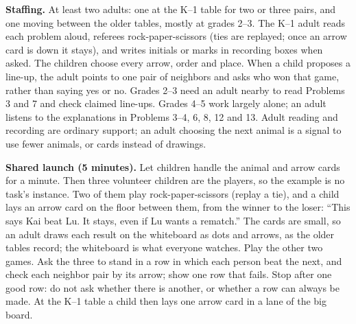 \documentclass[11pt]{article}
\newcommand{\bt}{\,$\to$\,\allowbreak}
\begin{document}
\textbf{Staffing.} At least two adults: one at the K--1 table for two or three pairs, and one moving between the older tables, mostly at grades 2--3. The K--1 adult reads each problem aloud, referees rock-paper-scissors (ties are replayed; once an arrow card is down it stays), and writes initials or marks in recording boxes when asked. The children choose every arrow, order and place. When a child proposes a line-up, the adult points to one pair of neighbors and asks who won that game, rather than saying yes or no. Grades 2--3 need an adult nearby to read Problems 3 and 7 and check claimed line-ups. Grades 4--5 work largely alone; an adult listens to the explanations in Problems 3--4, 6, 8, 12 and 13. Adult reading and recording are ordinary support; an adult choosing the next animal is a signal to use fewer animals, or cards instead of drawings.

\textbf{Shared launch (5 minutes).} Let children handle the animal and arrow cards for a minute. Then three volunteer children are the players, so the example is no task's instance. Two of them play rock-paper-scissors (replay a tie), and a child lays an arrow card on the floor between them, from the winner to the loser: ``This says Kai beat Lu. It stays, even if Lu wants a rematch.'' The cards are small, so an adult draws each result on the whiteboard as dots and arrows, as the older tables record; the whiteboard is what everyone watches. Play the other two games. Ask the three to stand in a row in which each person beat the next, and check each neighbor pair by its arrow; show one row that fails. Stop after one good row: do not ask whether there is another, or whether a row can always be made. At the K--1 table a child then lays one arrow card in a lane of the big board.
\begin{center}
\end{center}
\end{document}
